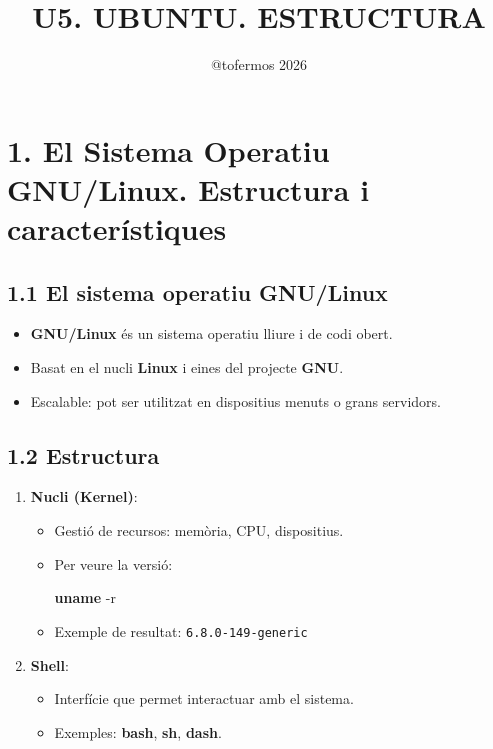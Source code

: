 \documentclass[
  catalan,
  a4paper,
]{article}
\title{U5. UBUNTU. ESTRUCTURA}
\author{@tofermos 2026}
\date{}
\newenvironment{Shaded}{\begin{snugshade}}{\end{snugshade}}
\newcommand{\AttributeTok}[1]{\textcolor[rgb]{0.13,0.29,0.53}{#1}}
\newcommand{\FunctionTok}[1]{\textcolor[rgb]{0.13,0.29,0.53}{\textbf{#1}}}
\providecommand{\tightlist}{%
  \setlength{\itemsep}{0pt}\setlength{\parskip}{0pt}}
\begin{document}
\maketitle

{
\setcounter{tocdepth}{2}
\tableofcontents
}
\newpage
\renewcommand\tablename{Tabla}

\section{1. El Sistema Operatiu GNU/Linux. Estructura i
característiques}\label{el-sistema-operatiu-gnulinux.-estructura-i-caracteruxedstiques}

\subsection{1.1 El sistema operatiu
GNU/Linux}\label{el-sistema-operatiu-gnulinux}

\begin{itemize}
\tightlist
\item
  \textbf{GNU/Linux} és un sistema operatiu lliure i de codi obert.
\item
  Basat en el nucli \textbf{Linux} i eines del projecte \textbf{GNU}.
\item
  Escalable: pot ser utilitzat en dispositius menuts o grans servidors.
\end{itemize}

\subsection{1.2 Estructura}\label{estructura}

\begin{enumerate}
\def\labelenumi{\arabic{enumi}.}
\tightlist
\item
  \textbf{Nucli (Kernel)}:

  \begin{itemize}
  \item
    Gestió de recursos: memòria, CPU, dispositius.
  \item
    Per veure la versió:

\begin{Shaded}
\begin{Highlighting}[]
\FunctionTok{uname} \AttributeTok{{-}r}
\end{Highlighting}
\end{Shaded}
  \item
    Exemple de resultat: \texttt{6.8.0-149-generic}
  \end{itemize}
\item
  \textbf{Shell}:

  \begin{itemize}
  \tightlist
  \item
    Interfície que permet interactuar amb el sistema.
  \item
    Exemples: \textbf{bash}, \textbf{sh}, \textbf{dash}.
  \end{itemize}
\end{enumerate}
\end{document}
